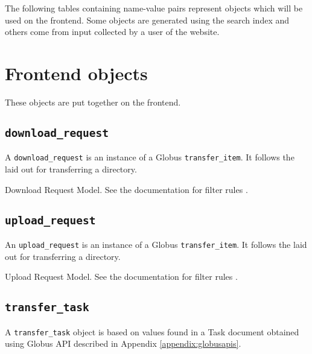 
The following tables containing name-value pairs represent objects which will 
be used on the frontend. Some objects are generated using the search index and 
others come from input collected by a user of the website.

\section{Frontend objects}
These objects are put together on the frontend.

\subsection{\texttt{download\_request}}
A \texttt{download\_request} is an instance of a Globus \linkglobustransferitem
{\texttt{transfer\_item}}. It follows the  
laid out for transferring a directory.

\begin{table}[h] %
    
    \caption{Download Request Model. See the documentation for filter rules .}
\end{table}

\subsection{\texttt{upload\_request}}
An \texttt{upload\_request} is an instance of a Globus \linkglobustransferitem
{\texttt{transfer\_item}}. It follows the  laid 
out for transferring a directory.

\begin{table}[h] %
    
    \caption{Upload Request Model. See the documentation for filter rules .}
\end{table}

\subsection{\texttt{transfer\_task}}
A \texttt{transfer\_task} object is based on values found in a \linkglobustaskdocument
{Task document} obtained using  Globus API 
described in Appendix \ref{appendix:globusapis}.

